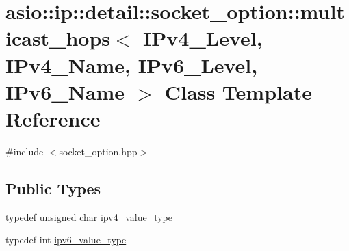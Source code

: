\hypertarget{classasio_1_1ip_1_1detail_1_1socket__option_1_1multicast__hops}{}\section{asio\+:\+:ip\+:\+:detail\+:\+:socket\+\_\+option\+:\+:multicast\+\_\+hops$<$ I\+Pv4\+\_\+\+Level, I\+Pv4\+\_\+\+Name, I\+Pv6\+\_\+\+Level, I\+Pv6\+\_\+\+Name $>$ Class Template Reference}
\label{classasio_1_1ip_1_1detail_1_1socket__option_1_1multicast__hops}


{\ttfamily \#include $<$socket\+\_\+option.\+hpp$>$}

\subsection*{Public Types}
\begin{DoxyCompactItemize}
\item 
typedef unsigned char \hyperlink{classasio_1_1ip_1_1detail_1_1socket__option_1_1multicast__hops_a0d02ef35af3a17021c1729cfed1aac37}{ipv4\+\_\+value\+\_\+type}
\item 
typedef int \hyperlink{classasio_1_1ip_1_1detail_1_1socket__option_1_1multicast__hops_a186549302284820cb23ca9271e45f371}{ipv6\+\_\+value\+\_\+type}
\end{DoxyCompactItemize}
